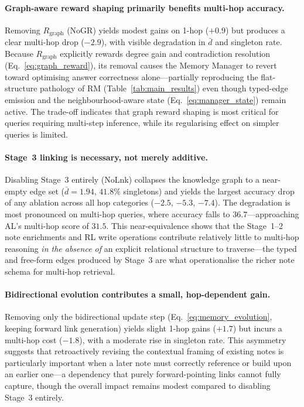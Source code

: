 \paragraph{Graph-aware reward shaping primarily benefits multi-hop accuracy.}
Removing $R_{\mathrm{graph}}$ (NoGR) yields modest gains on 1-hop ($+0.9$)
but produces a clear multi-hop drop ($-2.9$), with visible degradation in
$\bar{d}$ and singleton rate.
Because $R_{\mathrm{graph}}$ explicitly rewards degree gain and contradiction
resolution (Eq.~\eqref{eq:graph_reward}), its removal causes the Memory
Manager to revert toward optimising answer correctness alone---partially
reproducing the flat-structure pathology of RM
(Table~\ref{tab:main_results}) even though typed-edge emission and the
neighbourhood-aware state (Eq.~\eqref{eq:manager_state}) remain active.
The trade-off indicates that graph reward shaping is most critical for
queries requiring multi-step inference, while its regularising effect on
simpler queries is limited.

\paragraph{Stage~3 linking is necessary, not merely additive.}
Disabling Stage~3 entirely (NoLnk) collapses the knowledge graph to a
near-empty edge set ($\bar{d}=1.94$, $41.8\%$ singletons) and yields the
largest accuracy drop of any ablation across all hop categories ($-2.5$,
$-5.3$, $-7.4$).
The degradation is most pronounced on multi-hop queries, where accuracy falls
to $36.7$---approaching AL's multi-hop score of $31.5$.
This near-equivalence shows that the Stage~1--2 note enrichments and RL write
operations contribute relatively little to multi-hop reasoning \emph{in the
absence of} an explicit relational structure to traverse---the typed and
free-form edges produced by Stage~3 are what operationalise the richer note
schema for multi-hop retrieval.

\paragraph{Bidirectional evolution contributes a small, hop-dependent gain.}
Removing only the bidirectional update step (Eq.~\eqref{eq:memory_evolution},
keeping forward link generation) yields slight 1-hop gains ($+1.7$) but
incurs a multi-hop cost ($-1.8$), with a moderate rise in singleton rate.
This asymmetry suggests that retroactively revising the contextual framing of
existing notes is particularly important when a later note must correctly
reference or build upon an earlier one---a dependency that purely
forward-pointing links cannot fully capture, though the overall impact
remains modest compared to disabling Stage~3 entirely.
